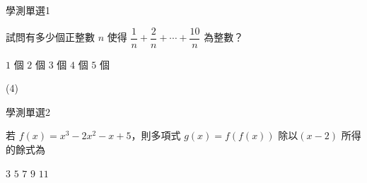 \begin{QUESTIONS}
    \begin{QUESTION}
        \begin{ExamInfo}{92}{學測}{單選}{1}
        \end{ExamInfo}
        \begin{ExamAnsRateInfo}{46}{74}{46}{18}
        \end{ExamAnsRateInfo}
        \begin{QBODY}
            試問有多少個正整數 $n$ 使得 $ \dfrac{1}{n} + \dfrac{2}{n} + \cdots + \dfrac{10}{n}$ 為整數？ 
            \begin{QOPS} 
                \QOP $1$ 個 
                \QOP $2$ 個  
                \QOP $3$ 個 
                \QOP $4$ 個 
                \QOP $5$ 個
            \end{QOPS}
        \end{QBODY}
        \begin{QFROMS}
        \end{QFROMS}
        \begin{QTAGS}\end{QTAGS}
        \begin{QANS}
            (4)
        \end{QANS}
        \begin{QSOLLIST}
        \end{QSOLLIST}
        \begin{QEMPTYSPACE}
        \end{QEMPTYSPACE}
    \end{QUESTION}
    \begin{QUESTION}
        \begin{ExamInfo}{92}{學測}{單選}{2}
        \end{ExamInfo}
        \begin{ExamAnsRateInfo}{46}{83}{44}{11}
        \end{ExamAnsRateInfo}
        \begin{QBODY}
            若 $f(x)=x^3 - 2x^2 -x +5$，則多項式 $g(x)=f(f(x))$ 除以$(x-2)$ 所得的餘式為 
            \begin{QOPS} 
                \QOP $3 $
                \QOP $5 $
                \QOP $7 $
                \QOP $9 $
                \QOP $11$
            \end{QOPS}
        \end{QBODY}
        \begin{QFROMS}

\end{QFROMS}
\end{QUESTION}
\end{QUESTIONS}
